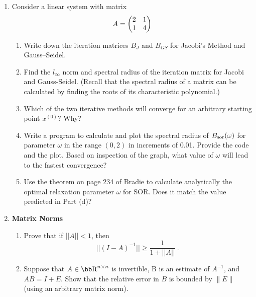 \documentclass [12pt]{article}
\begin{document}
\begin{enumerate}
\begin{enumerate}
\end{enumerate}

\item    Consider a linear system with matrix
$$
A = 
\begin{pmatrix}
2 & 1 \cr 1 & 4
\end{pmatrix}
$$
\begin{enumerate}
\item  Write down the iteration matrices $B_{J}$ and $B_{GS}$ for
Jacobi's Method and
Gauss--Seidel.%

\item  Find the $l_\infty$ norm and spectral radius of the
iteration matrix for Jacobi and Gauss-Seidel. (Recall that the
spectral radius of a matrix can be calculated by finding the roots
of its characteristic polynomial.)

\item  Which of the two iterative methods will converge for an
arbitrary starting point $x^{(0)}$?  Why?

\item  Write a program to calculate and plot the spectral radius
of $B_{\rm sor}(\omega)$ for parameter $\omega$ in the range $(0,
2)$ in increments of 0.01.  Provide the code and the plot. Based
on inspection of the graph, what value of $\omega$ will lead to
the fastest convergence?

\item  Use the theorem on page 234 of Bradie to calculate
analytically the optimal relaxation parameter $\omega$ for SOR.
Does it match the value predicted in Part (d)?
\end{enumerate}



\item  \textbf{Matrix Norms}

\begin{enumerate}

\item Prove that if $|| A || < 1$,
     then
        $$
            || (I-A)^{-1}|| \geq \frac{1}{1+ ||A||} ~.~
        $$

\item
Suppose that $A\in \R^{n\times n}$ is invertible, B is an estimate
of $A^{-1}$, and $AB=I+E$. Show that the relative error in $B$ is
bounded by $\| E\|$ (using an arbitrary matrix norm).

\end{enumerate}


\end{enumerate}
\end{document}
